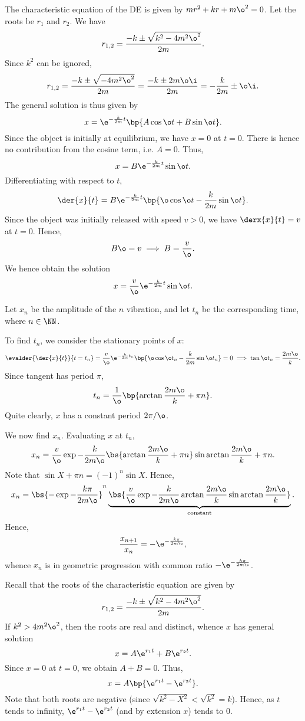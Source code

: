 \begin{solution}
    \begin{ppart}
        The characteristic equation of the DE is given by $m r^2 + kr + m \o^2 = 0$. Let the roots be $r_1$ and $r_2$. We have \[r_{1, 2} = \frac{-k \pm \sqrt{k^2 - 4m^2 \o^2}}{2m}.\] Since $k^2$ can be ignored, \[r_{1, 2} = \frac{-k \pm \sqrt{-4m^2 \o^2}}{2m} = \frac{-k \pm 2m \o \i}{2m} = -\frac{k}{2m} \pm \o \i.\] The general solution is thus given by \[x = \e^{-\frac{k}{2m} t} \bp{A \cos \o t + B \sin \o t}.\] Since the object is initially at equilibrium, we have $x = 0$ at $t = 0$. There is hence no contribution from the cosine term, i.e. $A = 0$. Thus, \[x = B \e^{-\frac{k}{2m} t} \sin \o t.\] Differentiating with respect to $t$, \[\der{x}{t} = B \e^{-\frac{k}{2m} t} \bp{\o \cos \o t - \frac{k}{2m} \sin \o t}.\] Since the object was initially released with speed $v > 0$, we have $\derx{x}{t} = v$ at $t = 0$. Hence, \[B \o = v \implies B = \frac{v}{\o}.\] We hence obtain the solution \[x = \frac{v}{\o} \e^{-\frac{k}{2m} t} \sin \o t.\]
    \end{ppart}
    \begin{ppart}
        Let $x_n$ be the amplitude of the $n$ vibration, and let $t_n$ be the corresponding time, where $n \in \NN$.

        To find $t_n$, we consider the stationary points of $x$: \[\evalder{\der{x}{t}}{t = t_n} = \frac{v}{\o} \e^{-\frac{k}{2m} t_n} \bp{\o \cos \o t_n - \frac{k}{2m} \sin \o t_n} = 0 \implies \tan \o t_n = \frac{2m\o}{k}.\] Since tangent has period $\pi$, \[t_n = \frac{1}{\o} \bp{\arctan \frac{2m\o}{k} + \pi n}.\] Quite clearly, $x$ has a constant period $2\pi / \o$.
        
        We now find $x_n$. Evaluating $x$ at $t_n$, \[x_n = \frac{v}{\o} \exp{-\frac{k}{2m \o} \bs{\arctan \frac{2m\o}{k} + \pi n}} \sin{\arctan \frac{2m\o}{k} + \pi n}.\] Note that $\sin{X + \pi n} = (-1)^n \sin X$. Hence, \[x_n = \bs{-\exp{-\frac{k\pi}{2m \o}}}^n \underbrace{\bs{\frac{v}{\o} \exp{-\frac{k}{2m \o} \arctan \frac{2m\o}{k}} \sin{\arctan \frac{2m\o}{k}}}}_{\text{constant}}.\] Hence, \[\frac{x_{n+1}}{x_n} = -\e^{-\frac{k\pi}{2m \o}},\] whence $x_n$ is in geometric progression with common ratio $-\e^{-\frac{k\pi}{2m \o}}$.
    \end{ppart}
    \begin{ppart}
        Recall that the roots of the characteristic equation are given by \[r_{1, 2} = \frac{-k \pm \sqrt{k^2 - 4m^2 \o^2}}{2m}.\] If $k^2 > 4m^2 \o^2$, then the roots are real and distinct, whence $x$ has general solution \[x = A\e^{r_1 t} + B\e^{r_2 t}.\] Since $x = 0$ at $t = 0$, we obtain $A + B = 0$. Thus, \[x = A\bp{\e^{r_1 t} - \e^{r_2 t}}.\] Note that both roots are negative (since $\sqrt{k^2 - X^2} < \sqrt{k^2} = k$). Hence, as $t$ tends to infinity, $\e^{r_1 t} - \e^{r_2 t}$ (and by extension $x$) tends to 0.


\end{ppart}
\end{solution}
